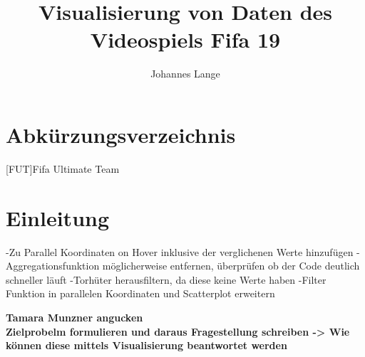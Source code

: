 \documentclass[usegeometry=true]{scrartcl}
\begin{document}
\subject{Projektbericht zum Modul Information Retrieval und Visualisierung Sommersemester 2021}
\title{Visualisierung von Daten des Videospiels Fifa 19}
\author{Johannes Lange}%
\maketitle%
%
\newpage
\tableofcontents
\newpage

\section*{Abkürzungsverzeichnis}\label{AV}
	\begin{acronym}
	[FUT]{Fifa Ultimate Team}
	\end{acronym}
\newpage
\section{Einleitung}

 -Zu Parallel Koordinaten on Hover inklusive der verglichenen Werte hinzufügen
 -Aggregationsfunktion möglicherweise entfernen, überprüfen ob der Code deutlich schneller läuft
 -Torhüter herausfiltern, da diese keine Werte haben
 -Filter Funktion in parallelen Koordinaten und Scatterplot erweitern

\textbf{Tamara Munzner angucken}\\
\textbf{Zielprobelm formulieren und daraus Fragestellung schreiben -> Wie können diese mittels Visualisierung beantwortet werden}
\end{document}
